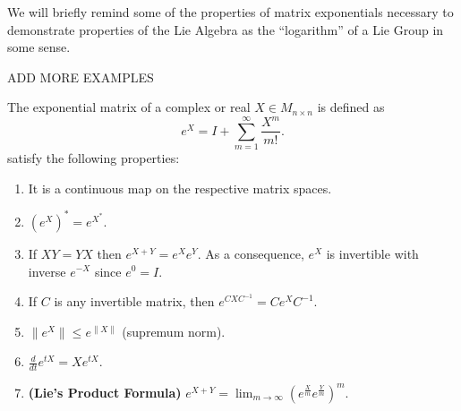 	We will briefly remind some of the properties of matrix exponentials necessary to demonstrate properties of the Lie Algebra as the “logarithm” of a Lie Group in some sense.
\begin{ex}
	ADD MORE EXAMPLES \label{11EXAMPLES}
\end{ex}
\begin{prop}
	The exponential matrix of a complex or real $X \in M_{n\times n}$ is defined as 
	$$e^X = I + \sum_{m=1}^\infty \frac{X^m}{m!}.$$
	satisfy the following properties:
	\begin{enumerate}[label=(\alph*)]
		\item It is a continuous map on the respective matrix spaces.
		\item $(e^X)^*=e^{X^*}$.
		\item If $XY=YX$ then $e^{X+Y}=e^Xe^Y$. As a consequence, $e^X$ is invertible with inverse $e^{-X}$ since $e^0=I$.
		\item If $C$ is any invertible matrix, then $e^{CXC^{-1}}=Ce^XC^{-1}$.
		\item $\|e^X\|\le e^{\|X\|}$ (supremum norm).
		\item $\frac{d}{dt}e^{tX} = Xe^{tX}$.
		\item \textbf{(Lie's Product Formula)} $e^{X+Y} = \displaystyle\lim_{m \rightarrow \infty} (e^{\frac{X}{m}}e^{\frac{Y}{m}})^m$.
	\end{enumerate}
	\label{MatrixExponential}
\end{prop}
